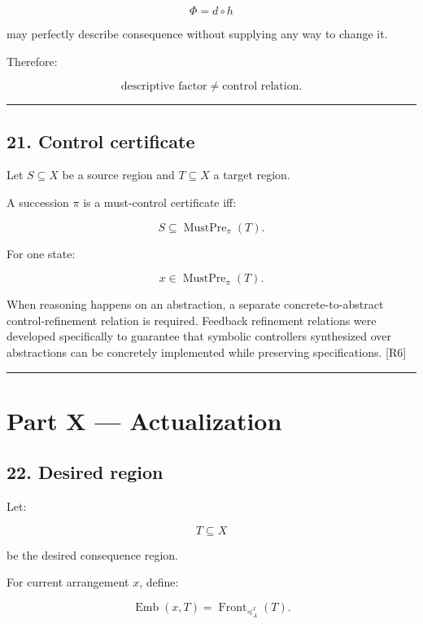\documentclass[
]{article}
\begin{document}
\[
\Phi=d\circ h
\]

may perfectly describe consequence without supplying any way to change
it.

Therefore:

\[
\boxed{
\text{descriptive factor}
\neq
\text{control relation}.
}
\]

\begin{center}\rule{0.5\linewidth}{0.5pt}\end{center}

\subsection{21. Control certificate}\label{control-certificate}

Let \(S\subseteq X\) be a source region and \(T\subseteq X\) a target
region.

A succession \(\pi\) is a must-control certificate iff:

\[
\boxed{
S\subseteq\operatorname{MustPre}_\pi(T).
}
\]

For one state:

\[
x\in\operatorname{MustPre}_\pi(T).
\]

When reasoning happens on an abstraction, a separate
concrete-to-abstract control-refinement relation is required. Feedback
refinement relations were developed specifically to guarantee that
symbolic controllers synthesized over abstractions can be concretely
implemented while preserving specifications. {[}R6{]}

\begin{center}\rule{0.5\linewidth}{0.5pt}\end{center}

\section{Part X --- Actualization}\label{part-x-actualization}

\subsection{22. Desired region}\label{desired-region}

Let:

\[
T\subseteq X
\]

be the desired consequence region.

For current arrangement \(x\), define:

\[
\boxed{
\operatorname{Emb}(x,T)
=
\operatorname{Front}_{\preceq_A^x}(T).
}
\]
\end{document}
